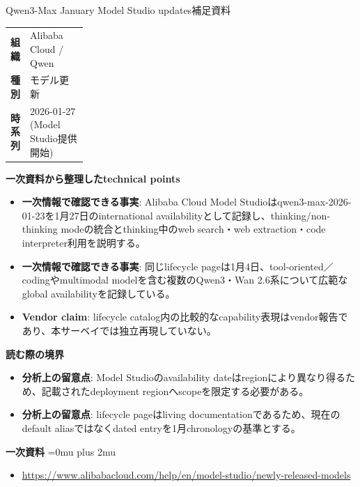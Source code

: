 \begin{technicalnote}{Qwen3-Max January Model Studio updates}{補足資料}
\begingroup
\begin{tabularx}{\linewidth}{@{}>{\bfseries}p{0.22\linewidth}X@{}}
組織 & Alibaba Cloud / Qwen \\
種別 & モデル更新 \\
時系列 & 2026-01-27 (Model Studio提供開始) \\
\end{tabularx}
\smallskip
{\bfseries 一次資料から整理したtechnical points}
\begin{itemize}[leftmargin=1.5em,itemsep=0.35em]
\item \textbf{一次情報で確認できる事実}: Alibaba Cloud Model Studioはqwen3-max-2026-01-23を1月27日のinternational availabilityとして記録し、thinking/non-thinking modeの統合とthinking中のweb search・web extraction・code interpreter利用を説明する。
\item \textbf{一次情報で確認できる事実}: 同じlifecycle pageは1月4日、tool-oriented／codingやmultimodal modelを含む複数のQwen3・Wan 2.6系について広範なglobal availabilityを記録している。
\item \textbf{Vendor claim}: lifecycle catalog内の比較的なcapability表現はvendor報告であり、本サーベイでは独立再現していない。
\end{itemize}
\begin{minipage}{\linewidth}
{\bfseries 読む際の境界}
\begin{itemize}[leftmargin=1.5em,itemsep=0.35em]
\item \textbf{分析上の留意点}: Model Studioのavailability dateはregionにより異なり得るため、記載されたdeployment regionへscopeを限定する必要がある。
\item \textbf{分析上の留意点}: lifecycle pageはliving documentationであるため、現在のdefault aliasではなくdated entryを1月chronologyの基準とする。
\end{itemize}
\begin{samepage}
{\bfseries 一次資料}
\begingroup\sloppy
\Urlmuskip=0mu plus 2mu\relax
\begin{itemize}[leftmargin=1.5em,itemsep=0.25em]
\item {\scriptsize\url{https://www.alibabacloud.com/help/en/model-studio/newly-released-models}}
\end{itemize}
\endgroup
\end{samepage}
\end{minipage}
\endgroup
\end{technicalnote}
\medskip

